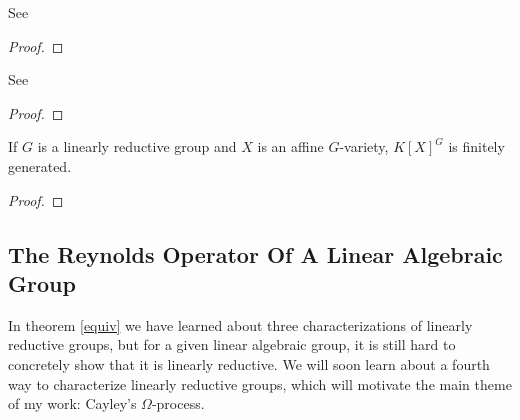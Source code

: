 \begin{lemma}
  See \cite[2.2.8]{DK15}
\end{lemma}

\begin{proof}
  
\end{proof}

\begin{lemma}
  See \cite[2.2.9]{DK15}
\end{lemma}

\begin{proof}
  
\end{proof}

\begin{theorem}
  If $G$ is a linearly reductive group and $X$ is an affine $G$-variety, $K[X]^G$ is finitely generated.
\end{theorem}

\begin{proof}
  
\end{proof}

\subsection{The Reynolds Operator Of A Linear Algebraic Group}



In theorem \ref{equiv} we have learned about three characterizations of linearly reductive groups, but for a given linear algebraic group, it is still hard to concretely show that it is linearly reductive.
We will soon learn about a fourth way to characterize linearly reductive groups, which will motivate the main theme of my work:  Cayley's $\Omega$-process.

